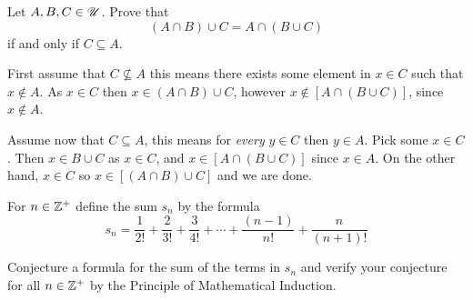 \documentclass[a4paper, english, 12pt]{article} %
\begin{document}
\begin{problem}[9]
  Let $A, B, C \in \mathscr{U}$. Prove that
  \begin{equation*}
    (A \cap B) \cup C = A \cap (B \cup C)
  \end{equation*}
  if and only if $ C \subseteq A$.
\end{problem}

\begin{answer}
  First assume that $C \not \subseteq A$ this means there exists some element in $x
  \in C$ such that $x \not\in A$. As $x \in C$ then $x \in (A \cap B) \cup C$,
  however $x \not\in [A \cap (B \cup C)]$, since $x \not\in A$.

  Assume now that $C \subseteq A$, this means for \emph{every} $y \in C$ then $y
  \in A$. Pick some $x \in C$. Then $x \in B \cup C$ as $x \in C$, and $x \in [A
  \cap (B \cup C)]$ since $x \in A$. On the other hand, $x \in C$ so $x \in [(A
  \cap B) \cup C]$ and we are done.
\end{answer}




\begin{problem}[6]
  For $n \in \mathbb{Z}^+$ define the sum $s_n$ by the formula
  \begin{equation*}
    s_n = \frac{1}{2!} + \frac{2}{3!} + \frac{3}{4!} + \cdots + \frac{(n-1)}{n!} + \frac{n}{(n+1)!}
  \end{equation*}
  \begin{subproblem}[4]
    Conjecture a formula for the sum of the terms in $s_n$ and verify your
    conjecture for all $n \in \mathbb{Z}^+$ by the Principle of Mathematical Induction.
  \end{subproblem}
\end{problem}
\end{document}
